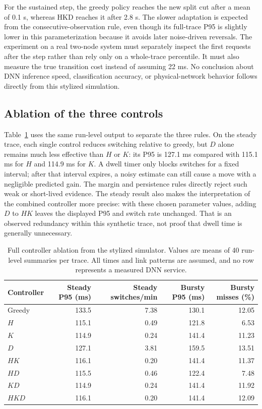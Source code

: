 \documentclass[10pt,a4paper,twocolumn]{article}
\begin{document}
For the sustained step, the greedy policy reaches the new split cut after a mean of 0.1 s, whereas HKD reaches it after 2.8 s. The slower adaptation is expected from the consecutive-observation rule, even though its full-trace P95 is slightly lower in this parameterization because it avoids later noise-driven reversals. The experiment on a real two-node system must separately inspect the first requests after the step rather than rely only on a whole-trace percentile. It must also measure the true transition cost instead of assuming 22 ms. No conclusion about DNN inference speed, classification accuracy, or physical-network behavior follows directly from this stylized simulation.

\subsection{Ablation of the three controls}
Table~\ref{tab:ablation} uses the same run-level output to separate the three rules. On the steady trace, each single control reduces switching relative to greedy, but $D$ alone remains much less effective than $H$ or $K$: its P95 is 127.1 ms compared with 115.1 ms for $H$ and 114.9 ms for $K$. A dwell timer only blocks switches for a fixed interval; after that interval expires, a noisy estimate can still cause a move with a negligible predicted gain. The margin and persistence rules directly reject such weak or short-lived evidence. The steady result also makes the interpretation of the combined controller more precise: with these chosen parameter values, adding $D$ to $HK$ leaves the displayed P95 and switch rate unchanged. That is an observed redundancy within this synthetic trace, not proof that dwell time is generally unnecessary.

\begin{table}[t]
\centering\small
\caption{Full controller ablation from the stylized simulator. Values are means of 40 run-level summaries per trace. All times and link patterns are assumed, and no row represents a measured DNN service.}
\label{tab:ablation}
\begin{tabular}{@{}lrrrr@{}}\toprule
Controller & Steady P95 (ms) & Steady switches/min & Bursty P95 (ms) & Bursty misses (\%)\\\midrule
Greedy & 133.5 & 7.38 & 130.1 & 12.05\\
$H$ & 115.1 & 0.49 & 121.8 & 6.53\\
$K$ & 114.9 & 0.24 & 141.4 & 11.23\\
$D$ & 127.1 & 3.81 & 159.5 & 13.51\\
$HK$ & 116.1 & 0.20 & 141.4 & 11.37\\
$HD$ & 115.5 & 0.46 & 122.4 & 7.48\\
$KD$ & 114.9 & 0.24 & 141.4 & 11.92\\
$HKD$ & 116.1 & 0.20 & 141.4 & 12.09\\\bottomrule
\end{tabular}
\end{table}
\end{document}
